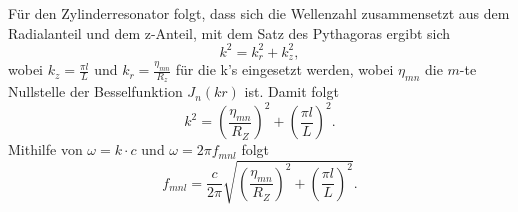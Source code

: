 Für den Zylinderresonator folgt, dass sich die Wellenzahl zusammensetzt aus dem Radialanteil und dem z-Anteil, mit dem Satz des Pythagoras ergibt sich
\begin{equation*}
    k^2 = k_r^2+k_z^2, 
\end{equation*}
wobei $k_z = \frac{\pi l}{L}$ und $k_r = \frac{\eta_{mn}}{R_z}$ für die k's eingesetzt werden, wobei $\eta_{mn}$ die $m$-te Nullstelle der Besselfunktion $J_n(kr)$ ist. Damit folgt 
\begin{equation*}
    k^2 = \left( \frac{\eta_{mn}}{R_Z} \right)^2 + \left( \frac{\pi l}{L} \right)^2.
\end{equation*}
Mithilfe von $\omega=k \cdot c$ und $\omega = 2 \pi f_{mnl}$ folgt
\begin{equation}
    f_{mnl} = \frac{c}{2\pi} \sqrt{\left( \frac{\eta_{mn}}{R_Z} \right)^2 + \left( \frac{\pi l}{L} \right)^2} .
    \label{eq:frequenz_zylinder}
\end{equation}

\clearpage